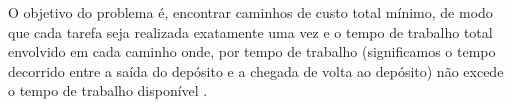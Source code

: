 O objetivo do problema é, encontrar caminhos de custo total mínimo, de modo que cada tarefa seja realizada exatamente uma vez e o tempo de trabalho total envolvido em cada caminho onde, por tempo de trabalho (significamos o tempo decorrido entre a saída do depósito e a chegada de volta ao depósito) não excede o tempo de trabalho disponível \cite{Beasley:1996}.






